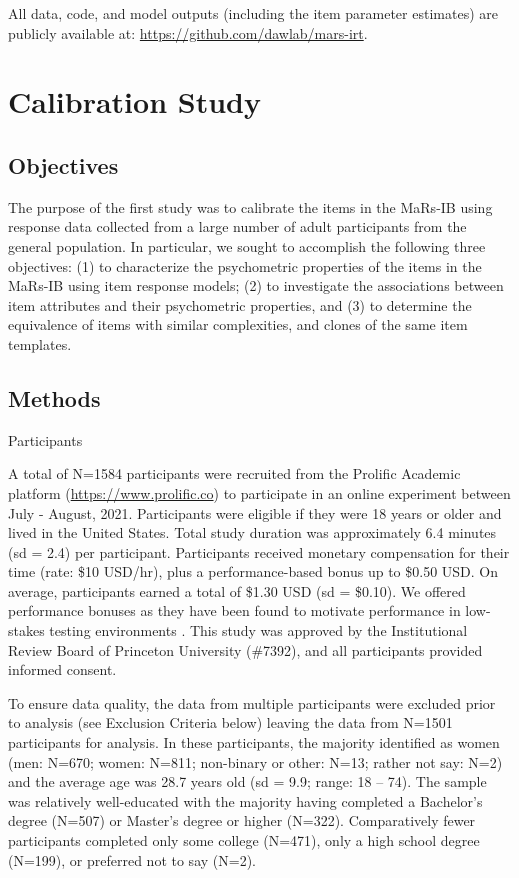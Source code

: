 \documentclass[a4paper,man,natbib]{apa6}
\makeatletter
\renewcommand{\subsubsection}{\@startsection{subsubsection}{3}
  {\z@}%
  {\b@level@two@skip}{\e@level@two@skip}%
  {\normalfont\normalsize\bfseries}}
\makeatother
\begin{document}
All data, code, and model outputs (including the item parameter estimates) are publicly available at: \url{https://github.com/dawlab/mars-irt}.

\clearpage
\section{Calibration Study}

\subsection{Objectives}

The purpose of the first study was to calibrate the items in the MaRs-IB using response data collected from a large number of adult participants from the general population. In particular, we sought to accomplish the following three objectives: (1) to characterize the psychometric properties of the items in the MaRs-IB using item response models; (2) to investigate the associations between item attributes and their psychometric properties, and (3) to determine the equivalence of items with similar complexities, and clones of the same item templates. 

\subsection{Methods}

\subsubsection{Participants} 

A total of N=1584 participants were recruited from the Prolific Academic platform (\url{https://www.prolific.co}) to participate in an online experiment between July - August, 2021. Participants were eligible if they were 18 years or older and lived in the United States. Total study duration was approximately 6.4 minutes (sd = 2.4) per participant. Participants received monetary compensation for their time (rate: \$10 USD/hr), plus a performance-based bonus up to \$0.50 USD. On average, participants earned a total of \$1.30 USD (sd = \$0.10). We offered performance bonuses as they have been found to motivate performance in low-stakes testing environments \citep{duckworth2011role, gignac2018moderate}. This study was approved by the Institutional Review Board of Princeton University (\#7392), and all participants provided informed consent.

To ensure data quality, the data from multiple participants were excluded prior to analysis (see Exclusion Criteria below) leaving the data from N=1501 participants for analysis. In these participants, the majority identified as women (men: N=670; women: N=811; non-binary or other: N=13; rather not say: N=2) and the average age was 28.7 years old (sd = 9.9; range: 18 -- 74). The sample was relatively well-educated with the majority having completed a Bachelor's degree (N=507) or Master's degree or higher (N=322). Comparatively fewer participants completed only some college (N=471), only a high school degree (N=199), or preferred not to say (N=2). 
\end{document}
